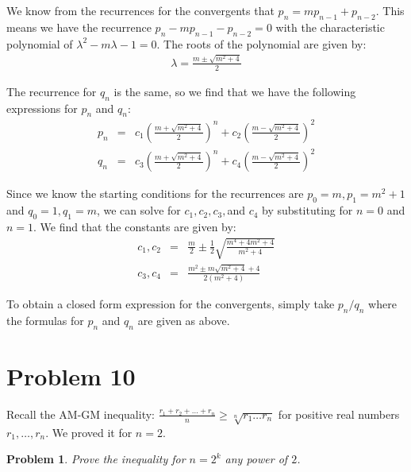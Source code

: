 \documentclass[psamsfonts]{amsart}
\newtheorem{prob}{Problem}[section]
\newenvironment{sol}{{\bfseries Solution}}{\qedsymbol}
\theoremstyle{definition}
\theoremstyle{remark}
\numberwithin{equation}{section}
\begin{document}
\begin{sol}
We know from the recurrences for the convergents that $p_{n} = m p_{n-1} + p_{n-2}$. This means we have the recurrence $p_{n} - m p_{n-1} - p_{n-2} = 0$ with the characteristic polynomial of $\lambda^2 - m \lambda - 1 = 0$. The roots of the polynomial are given by:
\begin{eqnarray}
\lambda = \frac{m \pm \sqrt{m^2 +4}}{2}
\end{eqnarray}

The recurrence for $q_n$ is the same, so we find that we have the following expressions for $p_n$ and $q_n$:
\begin{eqnarray}
p_n &=& c_1 \left( \frac{m + \sqrt{m^2 +4}}{2} \right)^n + c_2 \left( \frac{m - \sqrt{m^2 +4}}{2} \right)^2 \\ 
q_n &=&  c_3 \left( \frac{m + \sqrt{m^2 +4}}{2} \right)^n + c_4 \left( \frac{m - \sqrt{m^2 +4}}{2} \right)^2 
\end{eqnarray}

Since we know the starting conditions for the recurrences are $p_0 = m, p_1 = m^2 + 1$ and $q_0 = 1, q_1 = m$, we can solve for $c_1, c_2, c_3, $and $c_4$ by substituting for $n = 0$ and $n=1$. We find that the constants are given by:
\begin{eqnarray}
c_1, c_2 &=& \frac{m}{2} \pm \frac{1}{2} \sqrt{ \frac{m^4 + 4m^2 + 4}{m^2 + 4}} \\
c_3, c_4 &=& \frac{m^2 \pm m \sqrt{m^2 + 4} + 4}{2 (m^2 + 4)} 
\end{eqnarray}

To obtain a closed form expression for the convergents, simply take $p_n / q_n$ where the formulas for $p_n$ and $q_n$ are given as above.
\end{sol}

\section{Problem 10}

Recall the AM-GM inequality: $\frac{r_1 + r_2 + \ldots + r_n}{n} \geq \sqrt[n]{r_1\ldots r_n}$ for positive real numbers $r_1, \ldots, r_n$. We proved it for $n=2$.

\begin{prob}
Prove the inequality for $n = 2^k$ any power of $2$.
\end{prob}
\end{document}
